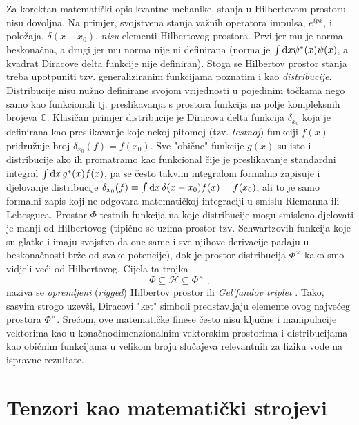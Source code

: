 Za korektan matematički opis kvantne mehanike, stanja u Hilbertovom
prostoru nisu dovoljna. Na primjer, svojstvena stanja važnih operatora
impulsa, $e^{i p x}$, i položaja, $\delta(x - x_0)$, \emph{nisu} elementi
Hilbertovog prostora. Prvi jer mu je norma beskonačna, a drugi jer mu
norma nije ni definirana (norma je $\int \textrm{d} x \psi^{*}(x) \psi(x)$,
a kvadrat Diracove delta funkcije nije definiran).
Stoga se Hilbertov prostor stanja treba upotpuniti tzv. generaliziranim
funkcijama poznatim i kao \emph{distribucije}. Distribucije nisu nužno
definirane svojom vrijednosti u pojedinim točkama nego samo kao funkcionali
tj. preslikavanja s prostora funkcija na polje kompleksnih brojeva $\mathbb{C}$.
Klasičan primjer distribucije je Diracova delta funkcija $\delta_{x_0}$ koja je definirana
kao preslikavanje koje nekoj pitomoj (tzv. \emph{testnoj}) funkciji $f(x)$
pridružuje broj $\delta_{x_0}(f) = f(x_0)$. Sve "obične" funkcije $g(x)$ su isto
i distribucije ako ih promatramo kao funkcional čije je preslikavanje 
standardni integral  $\int \textrm{d} x\, g^{*}(x) f(x)$,
pa se često takvim integralom formalno zapisuje i djelovanje distribucije
$\delta_{x_0}(f) \equiv \int \textrm{d} x\, \delta(x-x_0) f(x) = f(x_0)$, ali to je samo formalni zapis
koji ne odgovara matematičkoj integraciji u smislu Riemanna ili Lebesguea.
Prostor $\Phi$ testnih funkcija  na koje distribucije mogu smisleno djelovati je
manji od Hilbertovog (tipično se uzima prostor tzv. Schwartzovih funkcija koje su glatke
i imaju svojstvo da one same i sve njihove derivacije padaju u beskonačnosti brže od svake potencije),
dok je prostor
distribucija $\Phi^{\times}$ kako smo vidjeli veći od Hilbertovog.
Cijela ta trojka
\begin{equation}
    \Phi \subseteq \mathcal{H} \subseteq \Phi^{\times} \;,
    \label{eq:gelfand}
\end{equation}
naziva se \emph{opremljeni} (\emph{rigged}) Hilbertov prostor  ili
\emph{Gel'fandov triplet} \cite{Ballentine:1998}. 
Tako, sasvim strogo uzevši, Diracovi
"ket" simboli predstavljaju elemente ovog najvećeg prostora $\Phi^{\times}$.
Srećom, ove matematičke finese često nisu ključne i
manipulacije vektorima kao u konačnodimenzionalnim vektorskim prostorima i distribucijama
kao običnim funkcijama u velikom broju slučajeva relevantnih
za fiziku vode na ispravne rezultate.



\chapter{Tenzori kao matematički strojevi}
\label{sec:tenzorKaoStroj}

